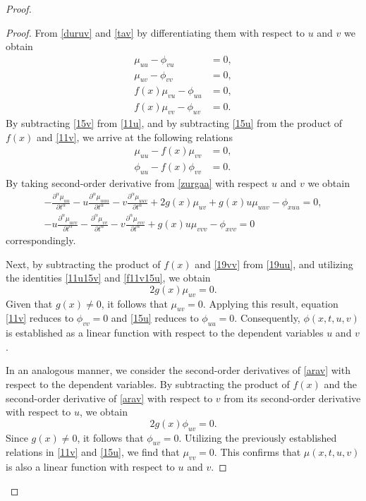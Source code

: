 \documentclass[12pt]{amsart}
\begin{document}
\begin{proof}
\begin{proof}
From \eqref{duruv} and \eqref{tav} by differentiating them with respect to $u$ and $v$ we obtain
\begin{align}
\mu_{uu} - \phi_{vu} &= 0, \label{11u} \\
\mu_{uv} - \phi_{vv} &= 0, \label{11v} \\
f(x)\mu_{vu} - \phi_{uu} &= 0,\label{15u}\\
f(x)\mu_{vv} - \phi_{uv} &= 0 \label{15v}.
\end{align}
By subtracting \eqref{15v} from \eqref{11u}, and by subtracting \eqref{15u} from the product of $f(x)$ and \eqref{11v},  we arrive at the following relations
\begin{align}
\mu_{uu} -  f(x) \mu_{vv} &= 0, \label{11u15v} \\
\phi_{uu} - f(x)\phi_{vv} &= 0 \label{f11v15u}. 
\end{align}
By taking second-order derivative from \eqref{zurgaa} with respect $u$ and $v$ we obtain
\begin{align}
-\frac{\partial^\alpha\mu_{uu}}{\partial t^\alpha}-u\frac{\partial^\alpha\mu_{uuu}}{\partial t^\alpha}-v\frac{\partial^\alpha\mu_{uuv}}{\partial t^\alpha}+2g(x)\mu_{uv}+g(x)u\mu_{uuv}-\phi_{xuu}=0 \label{19uu}, \\
-u\frac{\partial^\alpha\mu_{uvv}}{\partial t^\alpha}-\frac{\partial^\alpha\mu_{vv}}{\partial t^\alpha}-v\frac{\partial^\alpha\mu_{vvv}}{\partial t^\alpha}+g(x)u\mu_{vvv}-\phi_{xvv}=0
\label{19vv} 
\end{align}
correspondingly. 

Next, by subtracting the product of $f(x)$ and \eqref{19vv} from \eqref{19uu}, and utilizing the identities \eqref{11u15v} and \eqref{f11v15u}, we obtain
\begin{equation}
2g(x)\mu_{uv} = 0.
\end{equation}
Given that $g(x) \neq 0$, it follows that $\mu_{uv} = 0$. Applying this result, equation \eqref{11v} reduces to $\phi_{vv} = 0$ and \eqref{15u} reduces to $\phi_{uu} = 0$. Consequently, $\phi(x, t, u, v)$ is established as a linear function with respect to the dependent variables $u$ and $v$.

In an analogous manner, we consider the second-order derivatives of \eqref{arav} with respect to the dependent variables. By subtracting the product of $f(x)$ and the second-order derivative of \eqref{arav} with respect to $v$ from its second-order derivative with respect to $u$, we obtain
\begin{equation}
2g(x)\phi_{uv} = 0.
\end{equation}
Since $g(x) \neq 0$, it follows that $\phi_{uv} = 0$. Utilizing the previously established relations in \eqref{11v} and \eqref{15u}, we find that $\mu_{vv} = 0$. This confirms that $\mu(x, t, u, v)$ is also a linear function with respect to $u$ and $v$. 



\end{proof}
\end{proof}
\end{document}
